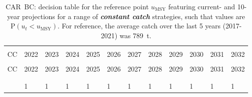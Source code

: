 \documentclass[11pt]{book}
\newcommand{\umsy}{u_\text{MSY}}
\newcommand{\itbf}[1]{\textit{\textbf{#1}}}
\begin{document}
\begin{longtable}[c]{>{\raggedright\let\newline\\\arraybackslash\hspace{0pt}}p{0.51in}>{\raggedleft\let\newline\\\arraybackslash\hspace{0pt}}p{0.51in}>{\raggedleft\let\newline\\\arraybackslash\hspace{0pt}}p{0.52in}>{\raggedleft\let\newline\\\arraybackslash\hspace{0pt}}p{0.52in}>{\raggedleft\let\newline\\\arraybackslash\hspace{0pt}}p{0.52in}>{\raggedleft\let\newline\\\arraybackslash\hspace{0pt}}p{0.52in}>{\raggedleft\let\newline\\\arraybackslash\hspace{0pt}}p{0.52in}>{\raggedleft\let\newline\\\arraybackslash\hspace{0pt}}p{0.52in}>{\raggedleft\let\newline\\\arraybackslash\hspace{0pt}}p{0.52in}>{\raggedleft\let\newline\\\arraybackslash\hspace{0pt}}p{0.52in}>{\raggedleft\let\newline\\\arraybackslash\hspace{0pt}}p{0.52in}>{\raggedleft\let\newline\\\arraybackslash\hspace{0pt}}p{0.52in}}
  \caption{CAR~BC: decision table for the reference point $\umsy$ featuring current- and 10-year projections for a range of \itbf{constant catch} strategies, such that values are P$(u_t < \umsy)$.  For reference, the average catch over the last 5 years (2017-2021) was 789~t. } \label{tab:car.gmu.umsy.CCs}\\  \hline\\[-2.2ex]  CC  & 2022 & 2023 & 2024 & 2025 & 2026 & 2027 & 2028 & 2029 & 2030 & 2031 & 2032 \\[0.2ex]\hline\\[-1.5ex]  \endfirsthead   \hline  CC  & 2022 & 2023 & 2024 & 2025 & 2026 & 2027 & 2028 & 2029 & 2030 & 2031 & 2032 \\[0.2ex]\hline\\[-1.5ex]  \endhead  \hline\\[-2.2ex]   \endfoot  \hline \endlastfoot  0 & 1 & 1 & 1 & 1 & 1 & 1 & 1 & 1 & 1 & 1 & 1 \\ 

\end{longtable}
\end{document}
